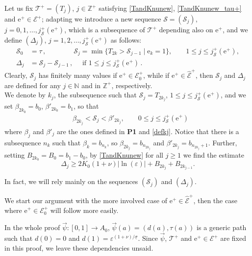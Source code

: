 \documentclass[10pt]{article}
\numberwithin{equation}{section}
\def\ep{\varepsilon}
\def\N{{\mathbb N}}
\def\Z{{\mathbb Z}}
\def\ee{{\mathrm e}}
\def\EE{{\mathcal E}}
\def\SS{{\mathcal S}}
\def\TT{{\mathcal T}}
\newcommand\assump[1]{{\rm\textbf{#1}}}
\theoremstyle{definition}
\theoremstyle{remark}
\begin{document}
Let us fix  $\TT^+=(T_j)$, $j \in \Z^+$ satisfying \eqref{TandKnunew},  \eqref{TandKnunew_tau+}
and $\ee^+ \in \EE^+$; adapting
\cite{BF11} we introduce a new sequence
$\SS=(\SS_j)$,  $j=0,1,\dots,j_\SS^+(\ee^+)$, which is a subsequence of $\TT^+$ depending also on $\ee^+$, and we define $(\Delta_j)$,
 $j=1,2,\dots,j_\SS^+(\ee^+)$ as
follows:
\begin{equation}\label{defSS}
\begin{split}
  \SS_0 &= \tau \,, \qquad \qquad  \SS_j= \min \{T_{2k} > \SS_{j-1} \mid \ee_k=1 \}  , \qquad 1 \le j \le j^+_{\SS}(\ee^+),\\
  \Delta_j &= \SS_j-\SS_{j-1}  \, , \quad \textrm{ if  $1 \le j \le j^+_{\SS}(\ee^+)$} \,.
\end{split}
\end{equation}
Clearly,  $\SS_j$ has finitely many values if $\ee^+ \in \EE^+_0$, while if $\ee^+ \in \hat{\EE}^+$,   then $\SS_j$ and $\Delta_j$ are
defined for any $j \in \N$ and in $\Z^+$, respectively.\\
We denote by $k_j$,   the  subsequence such that $\SS_j=T_{2k_j}$, $1 \le j  \le j^+_{\SS}(\ee^+)$, and we set
$\beta_{2k_0}=b_0$, $ \beta'_{2k_0}=b_1$, so that
\begin{equation}\label{defik}
\begin{split}
 & \beta_{2k_j} < \SS_j < \beta'_{2k_j}, \qquad 0 \le j \le j^+_{\SS}(\ee^+)
\end{split}
\end{equation}
where  $\beta_j$  and $\beta'_j$ are the ones defined in \assump{P1} and \eqref{defkj}.
Notice that there is a subsequence $n_k$ such that $\beta_{k}=b_{n_k}$, so
 $\beta_{2k_j} = b_{n_{2k_j}}$ and  $\beta'_{2k_j} = b_{n_{2k_j}+1}$.
Further, setting $B_{2k_0}=B_0=b_1-b_0$, by \eqref{TandKnunew} for all $j \geq 1$  we find the estimate
\begin{equation}\label{defDej}
\Delta_j \ge 2 K_0(1+\nu) |\ln(\ep)| + B_{2k_j}+ B_{2k_{j-1}} .
\end{equation}


In fact, we will rely mainly on the sequences $(\SS_j)$ and $(\Delta_j)$.

We start our argument with the more involved case of $\ee^+ \in \hat{\EE}^+$,  then the case where $\ee^+ \in  \EE^+_0$ will follow more
easily.


In the whole proof  $\vec{\psi}:[0,1] \to A_0$, $\vec{\psi}(a)=(d(a),\tau(a))$ is a generic path such that
$d(0)=0$ and $d(1)= \ep^{(1+\nu)/ \underline{\sigma}}$. Since $\vec{\psi}$, $\TT^+$ and $\ee^+ \in \EE^+$ are fixed in this proof, we leave
these dependencies unsaid.
\end{document}
